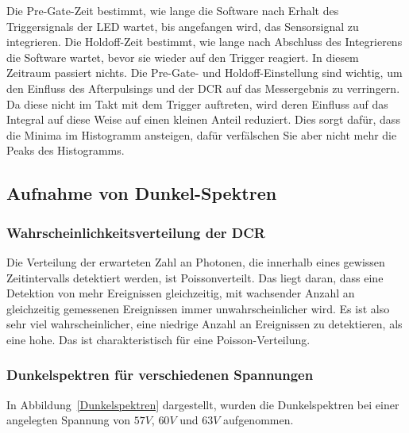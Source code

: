 \documentclass[12pt]{article}
\begin{document}
Die Pre-Gate-Zeit bestimmt, wie lange die Software nach Erhalt des Triggersignals der LED wartet, bis angefangen wird, das Sensorsignal zu integrieren.
Die Holdoff-Zeit bestimmt, wie lange nach Abschluss des Integrierens die Software wartet, bevor sie wieder auf den Trigger reagiert.
In diesem Zeitraum passiert nichts.
Die Pre-Gate- und Holdoff-Einstellung sind wichtig, um den Einfluss des Afterpulsings und der DCR auf das Messergebnis zu verringern. Da diese nicht im Takt mit dem Trigger auftreten, wird deren Einfluss auf das Integral auf diese Weise auf einen kleinen Anteil reduziert.
Dies sorgt dafür, dass die Minima im Histogramm ansteigen, dafür verfälschen Sie aber nicht mehr die Peaks des Histogramms.

\subsection{Aufnahme von Dunkel-Spektren}
\subsubsection{Wahrscheinlichkeitsverteilung der DCR}
Die Verteilung der erwarteten Zahl an Photonen, die innerhalb eines gewissen Zeitintervalls detektiert werden, ist Poissonverteilt.
Das liegt daran, dass eine Detektion von mehr Ereignissen gleichzeitig, mit wachsender Anzahl an gleichzeitig gemessenen Ereignissen immer unwahrscheinlicher wird.
Es ist also sehr viel wahrscheinlicher, eine niedrige Anzahl an Ereignissen zu detektieren, als eine hohe.
Das ist charakteristisch für eine Poisson-Verteilung.

\subsubsection{Dunkelspektren für verschiedenen Spannungen}
In Abbildung~\ref{Dunkelspektren} dargestellt, wurden die Dunkelspektren bei einer angelegten Spannung von $57V$, $60V$ und $63V$ aufgenommen.
\end{document}
